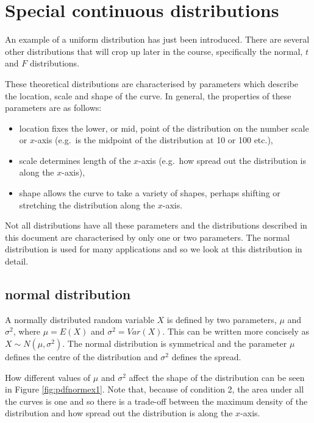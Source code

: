 \documentclass[
  oneside]{krantz}
\begin{document}
\hypertarget{special-continuous-distributions}{%
\section{Special continuous distributions}\label{special-continuous-distributions}}

An example of a uniform distribution has just been introduced. There are several other distributions that will crop up later in the course, specifically the normal, \(t\) and \(F\) distributions.

These theoretical distributions are characterised by parameters which describe the location, scale and shape of the curve. In general, the properties of these parameters are as follows:

\begin{itemize}
\item
  location fixes the lower, or mid, point of the distribution on the number scale or \(x\)-axis (e.g.~is the midpoint of the distribution at 10 or 100 etc.),
\item
  scale determines length of the \(x\)-axis (e.g.~how spread out the distribution is along the \(x\)-axis),
\item
  shape allows the curve to take a variety of shapes, perhaps shifting or stretching the distribution along the \(x\)-axis.
\end{itemize}

Not all distributions have all these parameters and the distributions described in this document are characterised by only one or two parameters. The normal distribution is used for many applications and so we look at this distribution in detail.

\hypertarget{normal-distribution}{%
\subsection{normal distribution}\label{normal-distribution}}

A normally distributed random variable \(X\) is defined by two parameters, \(\mu\) and \(\sigma^2\), where \(\mu=E(X)\) and \(\sigma^2=Var(X)\). This can be written more concisely as \(X \sim N(\mu, \sigma^2)\). The normal distribution is symmetrical and the parameter \(\mu\) defines the centre of the distribution and \(\sigma^2\) defines the spread.

How different values of \(\mu\) and \(\sigma^2\) affect the shape of the distribution can be seen in Figure \ref{fig:pdfnormex1}. Note that, because of condition 2, the area under all the curves is one and so there is a trade-off between the maximum density of the distribution and how spread out the distribution is along the \(x\)-axis.
\end{document}
